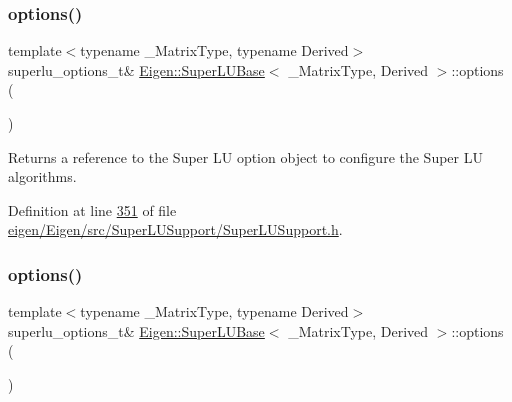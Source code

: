 \mbox{\label{class_eigen_1_1_super_l_u_base_a42d9d79073379f1e75b0f2c49879ed5b}} 
\subsubsection{\texorpdfstring{options()}{options()}\hspace{0.1cm}{\footnotesize\ttfamily [1/2]}}
{\footnotesize\ttfamily template$<$typename \+\_\+\+Matrix\+Type, typename Derived$>$ \\
superlu\+\_\+options\+\_\+t\& \hyperlink{class_eigen_1_1_super_l_u_base}{Eigen\+::\+Super\+L\+U\+Base}$<$ \+\_\+\+Matrix\+Type, Derived $>$\+::options (\begin{DoxyParamCaption}{ }\end{DoxyParamCaption})\hspace{0.3cm}{\ttfamily [inline]}}

\begin{DoxyReturn}{Returns}
a reference to the Super LU option object to configure the Super LU algorithms. 
\end{DoxyReturn}


Definition at line \hyperlink{eigen_2_eigen_2src_2_super_l_u_support_2_super_l_u_support_8h_source_l00351}{351} of file \hyperlink{eigen_2_eigen_2src_2_super_l_u_support_2_super_l_u_support_8h_source}{eigen/\+Eigen/src/\+Super\+L\+U\+Support/\+Super\+L\+U\+Support.\+h}.

\mbox{\label{class_eigen_1_1_super_l_u_base_a42d9d79073379f1e75b0f2c49879ed5b}} 
\subsubsection{\texorpdfstring{options()}{options()}\hspace{0.1cm}{\footnotesize\ttfamily [2/2]}}
{\footnotesize\ttfamily template$<$typename \+\_\+\+Matrix\+Type, typename Derived$>$ \\
superlu\+\_\+options\+\_\+t\& \hyperlink{class_eigen_1_1_super_l_u_base}{Eigen\+::\+Super\+L\+U\+Base}$<$ \+\_\+\+Matrix\+Type, Derived $>$\+::options (\begin{DoxyParamCaption}{ }\end{DoxyParamCaption})\hspace{0.3cm}{\ttfamily [inline]}}

